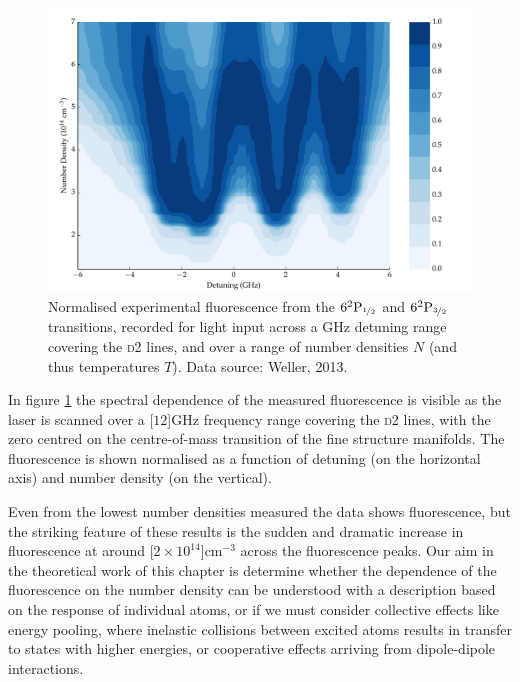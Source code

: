     \begin{figure}[]
    \includegraphics[width=\linewidth]
      {figs/05_twophoton/plot_blue_flourescence_fig1.pdf}
    \caption{
    Normalised experimental fluorescence from the
    $6^2\mathrm{P}_{\nicefrac{1}{2}}$ and $6^2\mathrm{P}_{\nicefrac{3}{2}}$
    transitions, recorded for light input across a GHz detuning range covering
    the \textsc{d2} lines, and over a range of number densities $N$ (and thus
    temperatures $T$). Data source: Weller, 2013\cite{Weller2013}.
    } 
    \label{fig:blue_flourescence} 
    \end{figure}

    In figure \ref{fig:blue_flourescence} the spectral dependence of the
    measured fluorescence is visible as the laser is scanned over a
    \unit[$12$]{GHz} frequency range covering the \textsc{d2} lines, with the
    zero centred on the centre-of-mass transition of the fine structure
    manifolds. The fluorescence is shown normalised as a function of detuning
    (on the horizontal axis) and number density (on the vertical).

    Even from the lowest number densities measured the data shows fluorescence,
    but the striking feature of these results is the sudden and dramatic
    increase in fluorescence at around \unit[$2\times10^{14}$]{cm$^{-3}$} across
    the fluorescence peaks. Our aim in the theoretical work of this chapter is
    determine whether the dependence of the fluorescence on the number density
    can be understood with a description based on the response of individual
    atoms, or if we must consider collective effects like energy
    pooling\cite{Bearman1978,Hill1979,Namiotka1997}, where inelastic collisions
    between excited atoms results in transfer to states with higher energies, or
    cooperative effects arriving from dipole-dipole
    interactions\cite{Keaveney2012a,Weller2011}.
